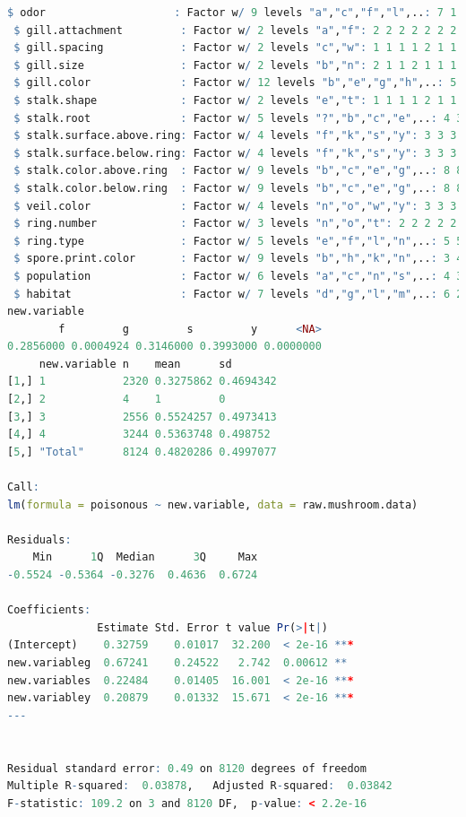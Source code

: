 \documentclass[12pt]{article}
\begin{document}
\begin{lstlisting}[language = R]
 $ odor                    : Factor w/ 9 levels "a","c","f","l",..: 7 1 4 7 6 1 1 4 7 1 ...
 $ gill.attachment         : Factor w/ 2 levels "a","f": 2 2 2 2 2 2 2 2 2 2 ...
 $ gill.spacing            : Factor w/ 2 levels "c","w": 1 1 1 1 2 1 1 1 1 1 ...
 $ gill.size               : Factor w/ 2 levels "b","n": 2 1 1 2 1 1 1 1 2 1 ...
 $ gill.color              : Factor w/ 12 levels "b","e","g","h",..: 5 5 6 6 5 6 3 6 8 3 ...
 $ stalk.shape             : Factor w/ 2 levels "e","t": 1 1 1 1 2 1 1 1 1 1 ...
 $ stalk.root              : Factor w/ 5 levels "?","b","c","e",..: 4 3 3 4 4 3 3 3 4 3 ...
 $ stalk.surface.above.ring: Factor w/ 4 levels "f","k","s","y": 3 3 3 3 3 3 3 3 3 3 ...
 $ stalk.surface.below.ring: Factor w/ 4 levels "f","k","s","y": 3 3 3 3 3 3 3 3 3 3 ...
 $ stalk.color.above.ring  : Factor w/ 9 levels "b","c","e","g",..: 8 8 8 8 8 8 8 8 8 8 ...
 $ stalk.color.below.ring  : Factor w/ 9 levels "b","c","e","g",..: 8 8 8 8 8 8 8 8 8 8 ...
 $ veil.color              : Factor w/ 4 levels "n","o","w","y": 3 3 3 3 3 3 3 3 3 3 ...
 $ ring.number             : Factor w/ 3 levels "n","o","t": 2 2 2 2 2 2 2 2 2 2 ...
 $ ring.type               : Factor w/ 5 levels "e","f","l","n",..: 5 5 5 5 1 5 5 5 5 5 ...
 $ spore.print.color       : Factor w/ 9 levels "b","h","k","n",..: 3 4 4 3 4 3 3 4 3 3 ...
 $ population              : Factor w/ 6 levels "a","c","n","s",..: 4 3 3 4 1 3 3 4 5 4 ...
 $ habitat                 : Factor w/ 7 levels "d","g","l","m",..: 6 2 4 6 2 2 4 4 2 4 ...
new.variable
        f         g         s         y      <NA> 
0.2856000 0.0004924 0.3146000 0.3993000 0.0000000 
     new.variable n    mean      sd       
[1,] 1            2320 0.3275862 0.4694342
[2,] 2            4    1         0        
[3,] 3            2556 0.5524257 0.4973413
[4,] 4            3244 0.5363748 0.498752 
[5,] "Total"      8124 0.4820286 0.4997077

Call:
lm(formula = poisonous ~ new.variable, data = raw.mushroom.data)

Residuals:
    Min      1Q  Median      3Q     Max 
-0.5524 -0.5364 -0.3276  0.4636  0.6724 

Coefficients:
              Estimate Std. Error t value Pr(>|t|)    
(Intercept)    0.32759    0.01017  32.200  < 2e-16 ***
new.variableg  0.67241    0.24522   2.742  0.00612 ** 
new.variables  0.22484    0.01405  16.001  < 2e-16 ***
new.variabley  0.20879    0.01332  15.671  < 2e-16 ***
---


Residual standard error: 0.49 on 8120 degrees of freedom
Multiple R-squared:  0.03878,	Adjusted R-squared:  0.03842 
F-statistic: 109.2 on 3 and 8120 DF,  p-value: < 2.2e-16


\end{lstlisting}
\end{document}
